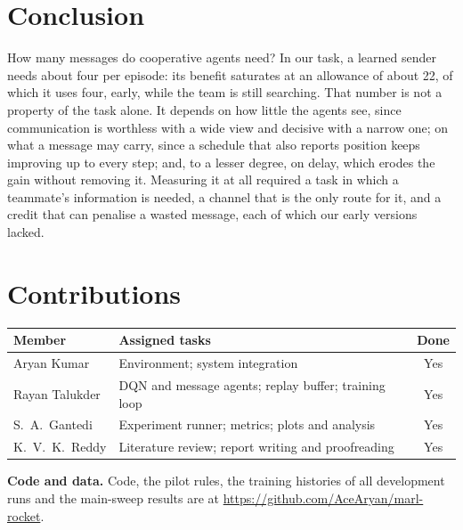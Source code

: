 \documentclass[twocolumn]{article}
\begin{document}
\section{Conclusion}

How many messages do cooperative agents need? In our task, a learned sender needs about four per
episode: its benefit saturates at an allowance of about 22, of which it uses four, early, while the
team is still searching. That number is not a property of the task alone. It depends on how little the
agents see, since communication is worthless with a wide view and decisive with a narrow one; on what a
message may carry, since a schedule that also reports position keeps improving up to every step; and,
to a lesser degree, on delay, which erodes the gain without removing it. Measuring it at all required a task in which
a teammate's information is needed, a channel that is the only route for it, and a credit that can
penalise a wasted message, each of which our early versions lacked.

\section*{Contributions}

\noindent\begin{minipage}{\linewidth}
\centering\small
\begin{tabularx}{\linewidth}{@{}l>{\raggedright\arraybackslash}Xc@{}}
\toprule
Member & Assigned tasks & Done \\
\midrule
Aryan Kumar & Environment; system integration & Yes \\
Rayan Talukder & DQN and message agents; replay buffer; training loop & Yes \\
S.\ A.\ Gantedi & Experiment runner; metrics; plots and analysis & Yes \\
K.\ V.\ K.\ Reddy & Literature review; report writing and proofreading & Yes \\
\bottomrule
\end{tabularx}
\end{minipage}

\vspace{6pt}
\textbf{Code and data.} Code, the pilot rules, the training histories of all development runs and the
main-sweep results are at \url{https://github.com/AceAryan/marl-rocket}.
\end{document}
